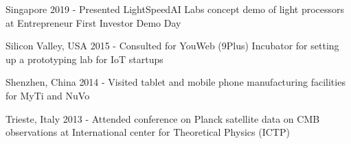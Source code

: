 % 


\begin{cvskills}

\cvskill
{Singapore} %
{2019 - Presented LightSpeedAI Labs concept demo of light processors at Entrepreneur First Investor Demo Day} %

  \cvskill
    {Silicon Valley, USA} %
    {2015 - Consulted for YouWeb (9Plus) Incubator for setting up a prototyping lab for IoT startups} %

  \cvskill
    {Shenzhen, China} %
    {2014 - Visited tablet and mobile phone manufacturing facilities for MyTi and NuVo} %

  \cvskill
    {Trieste, Italy} %
    {2013 - Attended conference on Planck satellite data on CMB observations at International center for Theoretical Physics (ICTP) } %

\end{cvskills}
% 
% 

